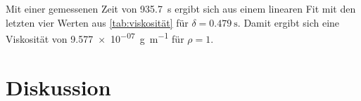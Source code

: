 Mit einer gemessenen Zeit von \SI{935.7}{\s} ergibt sich aus einem linearen Fit
mit den letzten vier Werten aus \autoref{tab:viskosität} für $\delta =
\SI{0.479}{\s}$. Damit ergibt sich eine Viskosität von
\SI{9.577e-07}{\gram\per\meter} für $\rho = 1$.

\section{Diskussion}
